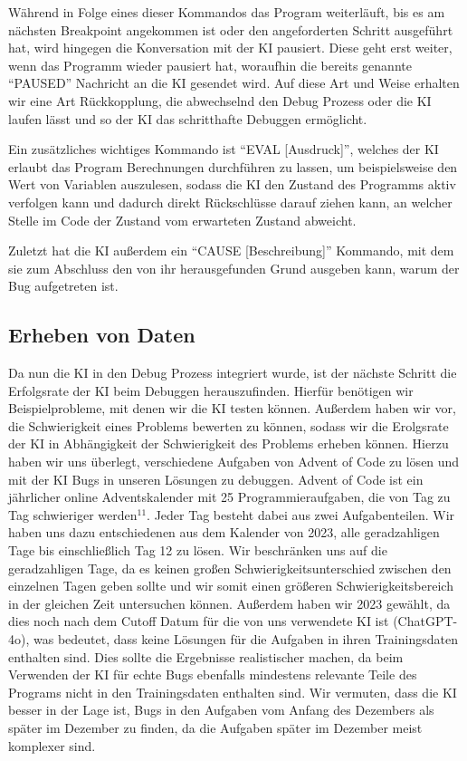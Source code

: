 \documentclass[a4paper,12pt,ngerman]{scrartcl}
\begin{document}
Während in Folge eines dieser Kommandos das Program weiterläuft, bis es am nächsten Breakpoint angekommen ist oder den angeforderten Schritt ausgeführt hat, wird hingegen die Konversation mit der KI pausiert. Diese geht erst weiter, wenn das Programm wieder pausiert hat, woraufhin die bereits genannte ``PAUSED'' Nachricht an die KI gesendet wird. Auf diese Art und Weise erhalten wir eine Art Rückkopplung, die abwechselnd den Debug Prozess oder die KI laufen lässt und so der KI das schritthafte Debuggen ermöglicht.

Ein zusätzliches wichtiges Kommando ist ``EVAL [Ausdruck]'', welches der KI erlaubt das Program Berechnungen durchführen zu lassen, um beispielsweise den Wert von Variablen auszulesen, sodass die KI den Zustand des Programms aktiv verfolgen kann und dadurch direkt Rückschlüsse darauf ziehen kann, an welcher Stelle im Code der Zustand vom erwarteten Zustand abweicht.

Zuletzt hat die KI außerdem ein ``CAUSE [Beschreibung]'' Kommando, mit dem sie zum Abschluss den von ihr herausgefunden Grund ausgeben kann, warum der Bug aufgetreten ist.

\subsection{Erheben von Daten}

Da nun die KI in den Debug Prozess integriert wurde, ist der nächste Schritt die Erfolgsrate der KI beim Debuggen herauszufinden. Hierfür benötigen wir Beispielprobleme, mit denen wir die KI testen können. Außerdem haben wir vor, die Schwierigkeit eines Problems bewerten zu können, sodass wir die Erolgsrate der KI in Abhängigkeit der Schwierigkeit des Problems erheben können. Hierzu haben wir uns überlegt, verschiedene Aufgaben von Advent of Code zu lösen und mit der KI Bugs in unseren Lösungen zu debuggen. Advent of Code ist ein jährlicher online Adventskalender mit 25 Programmieraufgaben, die von Tag zu Tag schwieriger werden$^{11}$. Jeder Tag besteht dabei aus zwei Aufgabenteilen. Wir haben uns dazu entschiedenen aus dem Kalender von 2023, alle geradzahligen Tage bis einschließlich Tag 12 zu lösen. Wir beschränken uns auf die geradzahligen Tage, da es keinen großen Schwierigkeitsunterschied zwischen den einzelnen Tagen geben sollte und wir somit einen größeren Schwierigkeitsbereich in der gleichen Zeit untersuchen können. Außerdem haben wir 2023 gewählt, da dies noch nach dem Cutoff Datum für die von uns verwendete KI ist (ChatGPT-4o), was bedeutet, dass keine Lösungen für die Aufgaben in ihren Trainingsdaten enthalten sind. Dies sollte die Ergebnisse realistischer machen, da beim Verwenden der KI für echte Bugs ebenfalls mindestens relevante Teile des Programs nicht in den Trainingsdaten enthalten sind. Wir vermuten, dass die KI besser in der Lage ist, Bugs in den Aufgaben vom Anfang des Dezembers als später im Dezember zu finden, da die Aufgaben später im Dezember meist komplexer sind.
\end{document}
